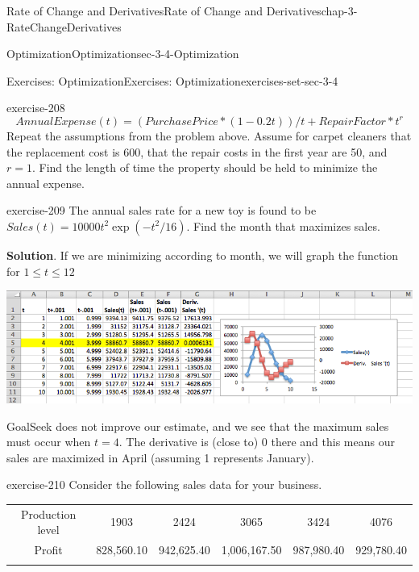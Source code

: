 \documentclass[oneside,10pt,]{book}
\numberwithin{equation}{section}
\newcommand{\hrulethin}  {\noalign{\hrule height 0.04em}}
\newcommand{\hrulethick} {\noalign{\hrule height 0.11em}}
\begin{document}
\begin{chapterptx}{Rate of Change and Derivatives}{}{Rate of Change and Derivatives}{}{}{chap-3-RateChangeDerivatives}
\begin{sectionptx}{Optimization}{}{Optimization}{}{}{sec-3-4-Optimization}
\begin{exercises-subsection-numberless}{Exercises: Optimization}{}{Exercises: Optimization}{}{}{exercises-set-sec-3-4}
\begin{divisionexercise}{18}{}{}{exercise-208}
\begin{equation*}
AnnualExpense(t)=(PurchasePrice*(1-0.2t))/t+RepairFactor*t^r
\end{equation*}
Repeat the assumptions from the problem above.  Assume for carpet cleaners that the replacement cost is \textdollar{}600, that the repair costs in the first year are \textdollar{}50, and \(r=1\).  Find the length of time the property should be held to minimize the annual expense.%
\end{divisionexercise}%
\begin{divisionexercise}{19}{}{}{exercise-209}%
\hypertarget{p-1319}{}%
The annual sales rate for a new toy is found to be \(Sales(t)=10000 t^2  \exp(-t^2/16)\). Find the month that maximizes sales.%
\par\smallskip%
\noindent\textbf{Solution}.\hypertarget{solution-104}{}\quad%
\hypertarget{p-1320}{}%
If we are minimizing according to month, we will graph the function for \(1 \le t \le 12\)%
\begin{sidebyside}{1}{0.1}{0.1}{0}%
\begin{sbspanel}{0.8}%
\includegraphics[width=1\linewidth]{images/sec3-4-sol19a.png}
\end{sbspanel}%
\end{sidebyside}%
\par
\hypertarget{p-1321}{}%
GoalSeek does not improve our estimate, and we see that the maximum sales must occur when \(t = 4\). The derivative is (close to) 0 there and this means our sales are maximized in April (assuming 1 represents January).%
\end{divisionexercise}%
\begin{divisionexercise}{20}{}{}{exercise-210}%
\hypertarget{p-1322}{}%
Consider the following sales data for your business.%
\begin{sidebyside}{1}{0}{0}{0}%
\begin{sbspanel}{1}%
{\centering%
\begin{tabular}{cccccc}\hrulethick
Production level&1903&2424&3065&3424&4076\tabularnewline\hrulethin
Profit&\textdollar{}828,560.10&\textdollar{}942,625.40&\textdollar{}1,006,167.50&\textdollar{}987,980.40&\textdollar{}929,780.40\tabularnewline\hrulethin

\end{tabular}}
\end{sbspanel}
\end{sidebyside}
\end{divisionexercise}
\end{exercises-subsection-numberless}
\end{sectionptx}
\end{chapterptx}
\end{document}
